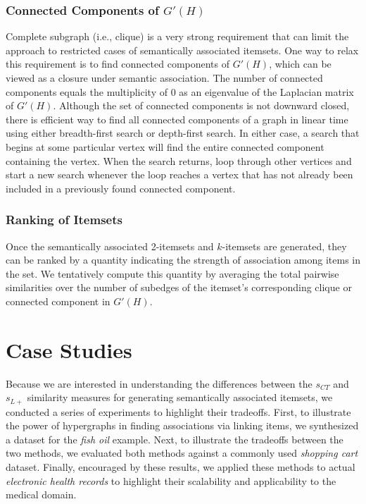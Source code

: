 \subsubsection{Connected Components of $G'(H)$}
Complete subgraph (i.e., clique) is a very strong requirement that can limit the approach to restricted cases of semantically associated itemsets. One way to relax this requirement is to find connected components of $G'(H)$, which can be viewed as a closure under semantic association. The number of connected components equals the multiplicity of 0 as an eigenvalue of the Laplacian matrix of $G'(H)$. Although the set of connected components is not downward closed, there is efficient way to find all connected components of a graph in linear time using either breadth-first search or depth-first search. In either case, a search that begins at some particular vertex will find the entire connected component containing the vertex. When the search returns, loop through other vertices and start a new search whenever the loop reaches a vertex that has not already been included in a previously found connected component.

\subsubsection{Ranking of Itemsets}
Once the semantically associated 2-itemsets and $k$-itemsets are generated, they can be ranked by a quantity indicating the strength of association among items in the set. We tentatively compute this quantity by averaging the total pairwise similarities over the number of subedges of the itemset's corresponding clique or connected component in $G'(H)$.

\section{Case Studies}
\label{experiment}
Because we are interested in understanding the differences between the $s_{CT}$ and $s_{L+}$ similarity measures for generating semantically associated itemsets, we conducted a series of experiments to highlight their tradeoffs.  First, to illustrate the power of hypergraphs in finding associations via linking items, we synthesized a dataset for the \emph{fish oil} example.  Next, to illustrate the tradeoffs between the two methods, we evaluated both methods against a commonly used \emph{shopping cart} dataset.  Finally, encouraged by these results, we applied these methods to actual \emph{electronic health records} to highlight their scalability and applicability to the medical domain.

